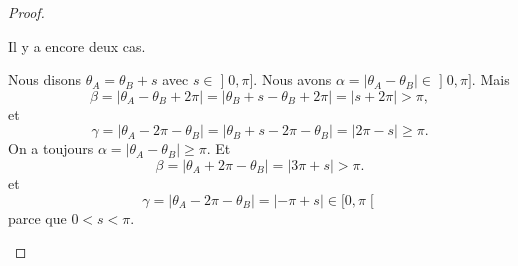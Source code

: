 \begin{proof}
\begin{subproof}
		Il y a encore deux cas.
		\begin{subproof}
			Nous disons \( \theta_A=\theta_B+s\) avec \( s\in\mathopen] 0,\pi\mathclose]\). Nous avons \(\alpha= | \theta_A-\theta_B |\in\mathopen] 0,\pi\mathclose]\). Mais
			\begin{equation}
				\beta=| \theta_A-\theta_B+2\pi |=| \theta_B+s-\theta_B+2\pi |=| s+2\pi |>\pi,
			\end{equation}
			et
			\begin{equation}
				\gamma=| \theta_A-2\pi-\theta_B |=| \theta_B+s-2\pi-\theta_B |=| 2\pi-s |\geq \pi.
			\end{equation}
			On a toujours \( \alpha= | \theta_A-\theta_B |\geq \pi\). Et
			\begin{equation}
				\beta=| \theta_A+2\pi-\theta_B |=| 3\pi+s |>\pi.
			\end{equation}
			et
			\begin{equation}
				\gamma=	| \theta_A-2\pi-\theta_B |=| -\pi+s |\in \mathopen[ 0,\pi\mathclose[
			\end{equation}
			parce que \( 0<s<\pi\).
		\end{subproof}
	\end{subproof}
\end{proof}

